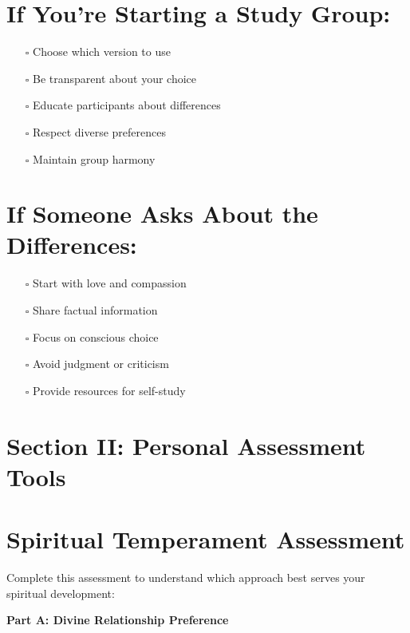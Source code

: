 \documentclass[11pt,twoside]{book}
\begin{document}
\section*{If You're Starting a Study Group:}
\label{sec:orga29454e}
\begin{itemize}
\item[{$\square$}] Choose which version to use
\item[{$\square$}] Be transparent about your choice
\item[{$\square$}] Educate participants about differences
\item[{$\square$}] Respect diverse preferences
\item[{$\square$}] Maintain group harmony
\end{itemize}
\section*{If Someone Asks About the Differences:}
\label{sec:orgd8f9765}
\begin{itemize}
\item[{$\square$}] Start with love and compassion
\item[{$\square$}] Share factual information
\item[{$\square$}] Focus on conscious choice
\item[{$\square$}] Avoid judgment or criticism
\item[{$\square$}] Provide resources for self-study
\end{itemize}
\section*{Section II: Personal Assessment Tools}
\label{sec:org223e761}

\section*{Spiritual Temperament Assessment}
\label{sec:org17ce780}

Complete this assessment to understand which approach best serves your spiritual development:

\textbf{\textbf{Part A: Divine Relationship Preference}}
\end{document}
